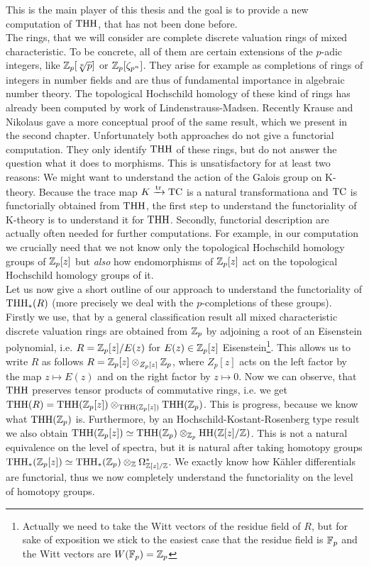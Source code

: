 This is the main player of this thesis and the goal is to provide a new computation of $\operatorname{THH}$, that has not been done before. \\
The rings, that we will consider are complete discrete valuation rings of mixed characteristic. 
To be concrete, all of them are certain extensions of the $p$-adic integers, like $\mathbb{Z}_p[\sqrt[n]{p}]$ or $\mathbb{Z}_p[\zeta_{p^n}]$. They arise for example as completions of rings of integers in number fields and are thus of fundamental importance in algebraic number theory.
The topological Hochschild homology of these kind of rings has already been computed by work of Lindenstrauss-Madsen. 
Recently Krause and Nikolaus gave a more conceptual proof of the same result, which we present in the second chapter. 
Unfortunately both approaches do not give a functorial computation. They only identify $\operatorname{THH}$ of these rings, but do not answer the question what it does to morphisms. 
This is unsatisfactory for at least two reasons: We might want to understand the action of the Galois group on K-theory. Because the trace map $K\xrightarrow{\operatorname{tr}}\operatorname{TC}$ is a natural transformationa and $\operatorname{TC}$ is functorially obtained from $\operatorname{THH}$, the first step to understand the functoriality of K-theory is to understand it for $\operatorname{THH}$.
Secondly, functorial description are actually often needed for further computations. For example, in our computation we crucially  need that we not know only the topological Hochschild homology groups of $\mathbb{Z}_p[z]$ but \textit{also}  
how endomorphisms of $\mathbb{Z}_p[z]$ act on the topological Hochschild homology groups of it. \\
Let us now give a short outline of our approach to understand the functoriality of $\operatorname{THH}_*(R)$ (more precisely we deal with the $p$-completions of these groups).
Firstly we use, that by a general classification result all mixed characteristic discrete valuation rings are obtained from $\mathbb{Z}_p$ by adjoining a root of an Eisenstein polynomial, i.e. $R=\mathbb{Z}_p[z]/E(z)$ for $E(z)\in \mathbb{Z}_p[z]$ Eisenstein\footnote{Actually we need to take the Witt vectors of the residue field of $R$, but for sake of exposition we stick to the easiest case that the residue field is $\mathbb{F}_p$ and the Witt vectors are $W(\mathbb{F}_p)=\mathbb{Z}_p$}.
This allows us to write $R$ as follows $R=\mathbb{Z}_p[z]\otimes_{Z_p[z]}\mathbb{Z}_p$, where $Z_p[z]$ acts on the left factor by the map $z\mapsto E(z)$ and on the right factor by $z\mapsto 0$. 
Now we can observe, that $\operatorname{THH}$ preserves tensor products of commutative rings, i.e. we get $\operatorname{THH}(R)=\operatorname{THH}(\mathbb{Z}_p[z])\otimes_{\operatorname{THH}(\mathbb{Z}_p[z])}\operatorname{THH}(\mathbb{Z}_p)$. This is progress, because we know what $\operatorname{THH}(\mathbb{Z}_p)$ is. Furthermore, by an Hochschild-Kostant-Rosenberg type result we also obtain $\operatorname{THH}(\mathbb{Z}_p[z])\simeq\operatorname{THH}(\mathbb{Z}_p)\otimes_{\mathbb{Z}_p}\operatorname{HH}(\mathbb{Z}[z]/\mathbb{Z})$. This is not a natural equivalence on the level of spectra, but it is natural after taking homotopy groups $\operatorname{THH}_*(\mathbb{Z}_p[z])\simeq\operatorname{THH}_*(\mathbb{Z}_p)\otimes_{\mathbb{Z}}\Omega^*_{\mathbb{Z}[z]/\mathbb{Z}}$. We exactly know how Kähler differentials are functorial, thus we now completely understand the functoriality on the level of homotopy groups. 